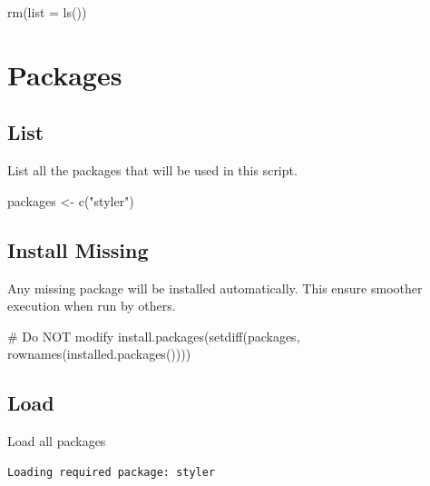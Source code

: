\documentclass[
  letterpaper,
  DIV=11,
  numbers=noendperiod]{scrreprt}
\newenvironment{Shaded}{\begin{snugshade}}{\end{snugshade}}
\newcommand{\AttributeTok}[1]{\textcolor[rgb]{0.40,0.45,0.13}{#1}}
\newcommand{\CommentTok}[1]{\textcolor[rgb]{0.37,0.37,0.37}{#1}}
\newcommand{\FunctionTok}[1]{\textcolor[rgb]{0.28,0.35,0.67}{#1}}
\newcommand{\NormalTok}[1]{\textcolor[rgb]{0.00,0.23,0.31}{#1}}
\newcommand{\OtherTok}[1]{\textcolor[rgb]{0.00,0.23,0.31}{#1}}
\newcommand{\StringTok}[1]{\textcolor[rgb]{0.13,0.47,0.30}{#1}}
\begin{document}
\begin{Shaded}
\begin{Highlighting}[]
\FunctionTok{rm}\NormalTok{(}\AttributeTok{list =} \FunctionTok{ls}\NormalTok{())}
\end{Highlighting}
\end{Shaded}

\section{Packages}\label{sec-packages}

\subsection{List}\label{list-4}

List all the packages that will be used in this script.

\begin{Shaded}
\begin{Highlighting}[]
\NormalTok{packages }\OtherTok{\textless{}{-}} \FunctionTok{c}\NormalTok{(}\StringTok{"styler"}\NormalTok{)}
\end{Highlighting}
\end{Shaded}

\subsection{Install Missing}\label{install-missing-4}

Any missing package will be installed automatically. This ensure
smoother execution when run by others.

\begin{Shaded}
\begin{Highlighting}[]
\CommentTok{\# Do NOT modify}
\FunctionTok{install.packages}\NormalTok{(}\FunctionTok{setdiff}\NormalTok{(packages, }\FunctionTok{rownames}\NormalTok{(}\FunctionTok{installed.packages}\NormalTok{())))}
\end{Highlighting}
\end{Shaded}

\subsection{Load}\label{load-4}

Load all packages

\begin{verbatim}
Loading required package: styler
\end{verbatim}
\end{document}

